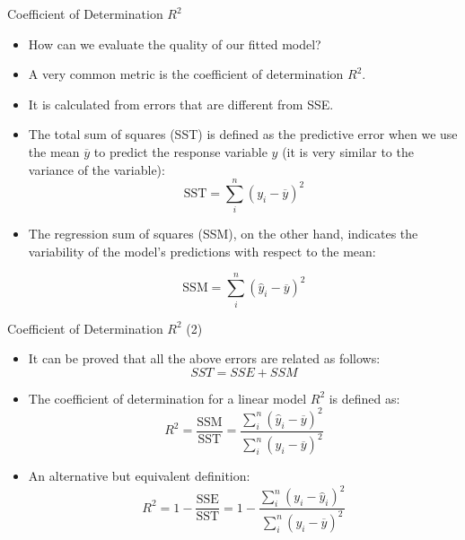 \documentclass[handout]{beamer}
\begin{document}
\begin{frame}{Coefficient of Determination $R^2$}
\scriptsize{
\begin{itemize}
 \item  How can we evaluate the quality of our fitted model?
 \item A very common metric is the coefficient of determination $R^2$. 
 \item  It is calculated from errors that are different from SSE.
 \item The total sum of squares (SST)  is defined as the predictive error when we use the mean $\overline{y}$  to predict the response variable $y$ (it is very similar to the variance of the variable):
 \begin{displaymath}
  \text{SST} = \sum_{i}^{n}(y_i-\overline{y})^2  
 \end{displaymath}
 \item  The regression sum of squares (SSM), on the other hand, indicates the variability of the model's predictions with respect to the mean:

 \begin{displaymath}
  \text{SSM} = \sum_{i}^{n}(\hat{y}_i-\overline{y})^2 
 \end{displaymath}
  
 
 
  
\end{itemize}

}
\end{frame}

\begin{frame}{Coefficient of Determination $R^2$ (2)}
\scriptsize{
\begin{itemize}
 \item It can be proved that all the above errors are related as follows: \begin{equation}
 SST = SSE + SSM                                                 
    \end{equation}


 \item The coefficient of determination for a linear model $R^2$ is defined as:
 \begin{equation}
  R^2= \frac{\text{SSM}}{\text{SST}} = \frac{\sum_{i}^{n}(\hat{y}_i-\overline{y})^2 }{\sum_{i}^{n}(y_i-\overline{y})^2  }
 \end{equation}
 
 \item An alternative but equivalent definition:
  \begin{equation}
  R^2= 1-\frac{\text{SSE}}{\text{SST}} = 1- \frac{\sum_{i}^{n}(y_i-\hat{y}_i)^2 }{\sum_{i}^{n}(y_i-\overline{y})^2  }
  \label{eq:r2}
 \end{equation}
 

  
\end{itemize}


}
\end{frame}
\end{document}
